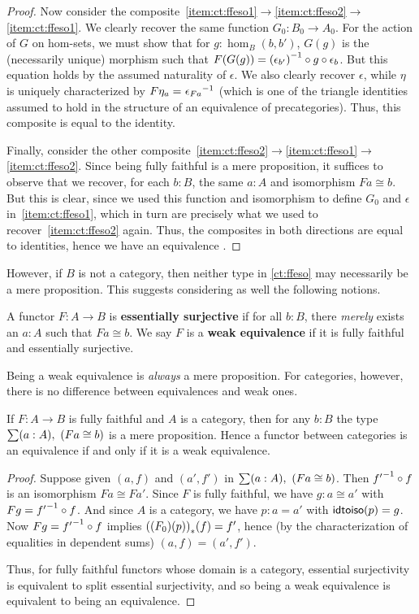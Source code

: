 \begin{proof}
  Now consider the composite~\ref{item:ct:ffeso1}$\to$\ref{item:ct:ffeso2}$\to$\ref{item:ct:ffeso1}.
  We clearly recover the same function $G_0:B_0 \to A_0$.
  For the action of $G$ on hom-sets, we must show that for $g:\hom_B(b,b')$, $G(g)$ is the (necessarily unique) morphism such that $F(G(g)) = {(\epsilon_{b'})}^{-1}\circ g \circ \epsilon_b$.
  But this equation holds by the assumed naturality of $\epsilon$.
  We also clearly recover $\epsilon$, while $\eta$ is uniquely characterized by $F\eta_a =_{} {\epsilon_{Fa}}^{-1}$ (which is one of the triangle identities assumed to hold in the structure of an equivalence of precategories).
  Thus, this composite is equal to the identity.

  Finally, consider the other composite~\ref{item:ct:ffeso2}$\to$\ref{item:ct:ffeso1}$\to$\ref{item:ct:ffeso2}.
  Since being fully faithful is a mere proposition, it suffices to observe that we recover, for each $b:B$, the same $a:A$ and isomorphism $F a \cong b$.
  But this is clear, since we used this function and isomorphism to define $G_0$ and $\epsilon$ in~\ref{item:ct:ffeso1}, which in turn are precisely what we used to recover~\ref{item:ct:ffeso2} again.
  Thus, the composites in both directions are equal to identities, hence we have an equivalence \eqv{\ref{item:ct:ffeso1}}{\ref{item:ct:ffeso2}}.
\end{proof}

However, if $B$ is not a category, then neither type in \autoref{ct:ffeso} may necessarily be a mere proposition.
This suggests considering as well the following notions.

\begin{defn}
  A functor $F:A\to B$ is \textbf{essentially surjective} if for all $b:B$, there \emph{merely} exists an $a:A$ such that $Fa\cong b$.
  We say $F$ is a \textbf{weak equivalence} if it is fully faithful and essentially surjective.
\end{defn}

Being a weak equivalence is \emph{always} a mere proposition.
For categories, however, there is no difference between equivalences and weak ones.

\begin{lem}\label{ct:catweq}
  If $F:A\to B$ is fully faithful and $A$ is a category, then for any $b:B$ the type $\sm{a:A} (Fa\cong b)$ is a mere proposition.
  Hence a functor between categories is an equivalence if and only if it is a weak equivalence.
\end{lem}
\begin{proof}
  Suppose given $(a,f)$ and $(a',f')$ in $\sm{a:A} (Fa\cong b)$.
  Then ${f'}^{-1}\circ f$ is an isomorphism $Fa \cong Fa'$.
  Since $F$ is fully faithful, we have $g:a\cong a'$ with $Fg = {f'}^{-1}\circ f$.
  And since $A$ is a category, we have $p:a=a'$ with $\mathsf{idtoiso}(p)=g$.
  Now $Fg = {f'}^{-1}\circ f$ implies ${({(F_0)}\!\left({p}\right))}_{*}\!\left({f}\right) = f'$, hence (by the characterization of equalities in dependent sums) $(a,f)=(a',f')$.

  Thus, for fully faithful functors whose domain is a category, essential surjectivity is equivalent to split essential surjectivity, and so being a weak equivalence is equivalent to being an equivalence.
\end{proof}

